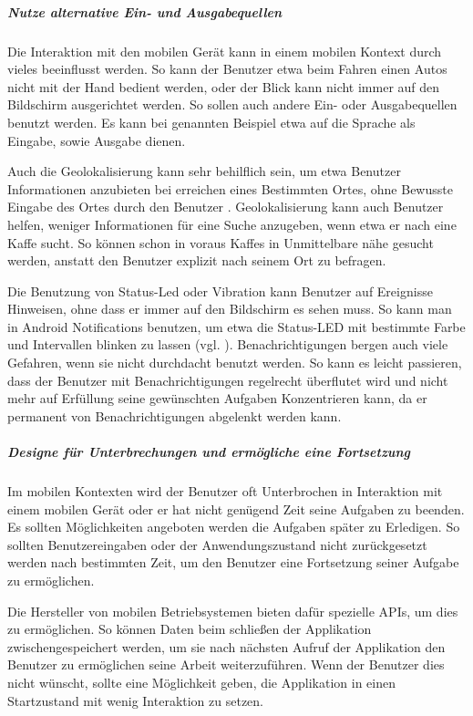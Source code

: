 \subparagraph{Nutze alternative Ein- und Ausgabequellen}
\label{subp:nutze_alternative_eingabenger_ten}

Die Interaktion mit den mobilen Gerät kann in einem mobilen Kontext durch vieles beeinflusst werden. So kann der Benutzer etwa beim Fahren einen Autos nicht mit der Hand bedient werden, oder der Blick kann nicht immer auf den Bildschirm ausgerichtet werden. So sollen auch andere Ein- oder Ausgabequellen benutzt werden. Es kann bei genannten Beispiel etwa auf die Sprache als Eingabe, sowie Ausgabe dienen. 

Auch die Geolokalisierung kann sehr behilflich sein, um etwa Benutzer Informationen anzubieten bei erreichen eines Bestimmten Ortes, ohne Bewusste Eingabe des Ortes durch den Benutzer . Geolokalisierung kann auch Benutzer helfen, weniger Informationen für eine Suche anzugeben, wenn etwa er nach eine Kaffe sucht. So können schon in voraus Kaffes in Unmittelbare nähe gesucht werden, anstatt den Benutzer explizit nach seinem Ort zu befragen.

Die Benutzung von Status-Led oder Vibration kann Benutzer auf Ereignisse Hinweisen, ohne dass er immer auf den Bildschirm es sehen muss. So kann man in Android Notifications benutzen, um etwa die Status-LED mit bestimmte Farbe und Intervallen blinken zu lassen (vgl. \cite{androidNotApi}). Benachrichtigungen bergen auch viele Gefahren, wenn sie nicht durchdacht benutzt werden. So kann es leicht passieren, dass der Benutzer mit Benachrichtigungen regelrecht überflutet wird und nicht mehr auf Erfüllung seine gewünschten Aufgaben Konzentrieren kann, da er permanent von Benachrichtigungen abgelenkt werden kann.

\subparagraph{Designe für Unterbrechungen und ermögliche eine Fortsetzung}
\label{subp:erm_gliche_eine_fortsetzung}

Im mobilen Kontexten wird der Benutzer oft Unterbrochen in Interaktion mit einem mobilen Gerät oder er hat nicht genügend Zeit seine Aufgaben zu beenden. Es sollten Möglichkeiten angeboten werden die Aufgaben später zu Erledigen. So sollten Benutzereingaben oder der Anwendungszustand nicht zurückgesetzt werden nach bestimmten Zeit, um den Benutzer eine Fortsetzung seiner Aufgabe zu ermöglichen.

Die Hersteller von mobilen Betriebsystemen bieten dafür spezielle APIs, um dies zu ermöglichen. So können Daten beim schließen der Applikation zwischengespeichert werden, um sie nach nächsten Aufruf der Applikation den Benutzer zu ermöglichen seine Arbeit weiterzuführen. Wenn der Benutzer dies nicht wünscht, sollte eine Möglichkeit geben, die Applikation in einen Startzustand mit wenig Interaktion zu setzen.

